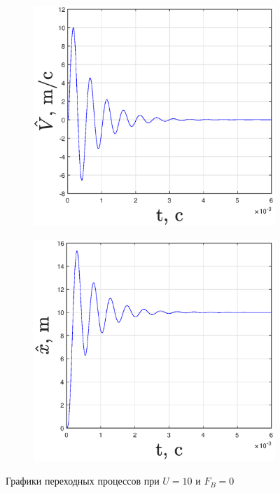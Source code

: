 \documentclass[fleqn, a4paper, 11pt, russian]{article}
\begin{document}
\begin{figure}[ht!]
		\begin{subfigure}[b]{0.49\textwidth}
			\includegraphics[width = \textwidth]{Base/baseV}
		\end{subfigure}
		\hfill
		\begin{subfigure}[b]{0.49\textwidth}
			\includegraphics[width = \textwidth]{Base/baseX}
		\end{subfigure}
		\caption{Графики переходных процессов при $U = 10$ и $F_B = 0$}
		\label{baseTP}
	\end{figure}
\end{document}
